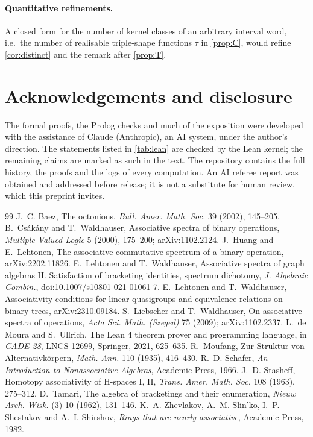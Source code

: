 \documentclass[11pt,a4paper]{article}
\theoremstyle{definition}
\theoremstyle{remark}
\begin{document}
\paragraph{Quantitative refinements.} A closed form for the number of kernel classes of an arbitrary
interval word, i.e.\ the number of realisable triple-shape functions $\tau$ in \cref{prop:C}, would
refine \cref{cor:distinct} and the remark after \cref{prop:T}.

\section*{Acknowledgements and disclosure}
The formal proofs, the Prolog checks and much of the exposition were developed with the assistance of
Claude (Anthropic), an AI system, under the author's direction. The statements listed in
\cref{tab:lean} are checked by the Lean kernel; the remaining claims are marked as such in the text. The
repository contains the full history, the proofs and the logs of every computation. An AI referee report
was obtained and addressed before release; it is not a substitute for human review, which this preprint
invites.

\begin{thebibliography}{99}\small
{} J.~C. Baez, The octonions, \emph{Bull. Amer. Math. Soc.} 39 (2002), 145--205.
 B.~Cs\'ak\'any and T.~Waldhauser, Associative spectra of binary operations,
  \emph{Multiple-Valued Logic} 5 (2000), 175--200; arXiv:1102.2124.
 J.~Huang and E.~Lehtonen, The associative-commutative spectrum of a binary operation,
  arXiv:2202.11826.
 E.~Lehtonen and T.~Waldhauser, Associative spectra of graph algebras II. Satisfaction of
  bracketing identities, spectrum dichotomy, \emph{J. Algebraic Combin.},
  doi:10.1007/s10801-021-01061-7.
 E.~Lehtonen and T.~Waldhauser, Associativity conditions for linear quasigroups and
  equivalence relations on binary trees, arXiv:2310.09184.
 S.~Liebscher and T.~Waldhauser, On associative spectra of operations,
  \emph{Acta Sci. Math. (Szeged)} 75 (2009); arXiv:1102.2337.
 L.~de Moura and S.~Ullrich, The Lean 4 theorem prover and programming language,
  in \emph{CADE-28}, LNCS 12699, Springer, 2021, 625--635.
 R.~Moufang, Zur Struktur von Alternativk\"orpern, \emph{Math. Ann.} 110 (1935),
  416--430.
 R.~D. Schafer, \emph{An Introduction to Nonassociative Algebras}, Academic Press, 1966.
 J.~D. Stasheff, Homotopy associativity of H-spaces I, II, \emph{Trans. Amer. Math. Soc.}
  108 (1963), 275--312.
 D.~Tamari, The algebra of bracketings and their enumeration, \emph{Nieuw Arch. Wisk.}
  (3) 10 (1962), 131--146.
 K.~A. Zhevlakov, A.~M. Slin'ko, I.~P. Shestakov and A.~I. Shirshov, \emph{Rings that
  are nearly associative}, Academic Press, 1982.
\end{thebibliography}
\end{document}

